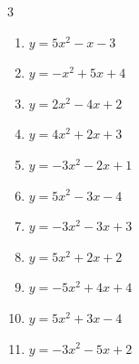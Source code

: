 \begin{multicols}{3}
\begin{enumerate}
  \item $\displaystyle y=5x^{2}-x-3$


  \item $\displaystyle y=-x^{2}+5x+4$


\columnbreak %

  \item $\displaystyle y=2x^{2}-4x+2$

        \phantom{$\displaystyle 頂点\left( 1 , 0 \right)$}

  \item $\displaystyle y=4x^{2}+2x+3$


  \item $\displaystyle y=-3x^{2}-2x+1$


  \item $\displaystyle y=5x^{2}-3x-4$


  \item $\displaystyle y=-3x^{2}-3x+3$


\columnbreak %

  \item $\displaystyle y=5x^{2}+2x+2$


  \item $\displaystyle y=-5x^{2}+4x+4$


  \item $\displaystyle y=5x^{2}+3x-4$


  \item $\displaystyle y=-3x^{2}-5x+2$


\end{enumerate}
\end{multicols}
